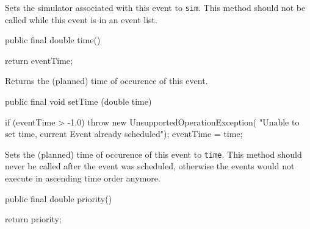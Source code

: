   \begin{tabb}  Sets the simulator associated with this event to
    \texttt{sim}.
    This method should not be called while this event is in an event list.
  \end{tabb}
\begin{htmlonly}
\end{htmlonly}
\begin{code}

   public final double time() \begin{hide} {
      return eventTime;
   } \end{hide}
\end{code}
  \begin{tabb}  Returns the (planned) time of occurence of this event.
  \end{tabb}
\begin{htmlonly}
\end{htmlonly}
\begin{code}

   public final void setTime (double time) \begin{hide} {
      if (eventTime > -1.0)
         throw new UnsupportedOperationException(
            "Unable to set time, current Event already scheduled");
      eventTime = time;
   } \end{hide}
\end{code}
  \begin{tabb}  Sets the (planned) time of occurence of this event to \texttt{time}.
   This method should never be called after the event was scheduled, otherwise
   the events would not execute in ascending time order anymore.
  \end{tabb}
\begin{htmlonly}
\end{htmlonly}
\begin{code}

   public final double priority() \begin{hide} {
      return priority;
   } \end{hide}
\end{code}
